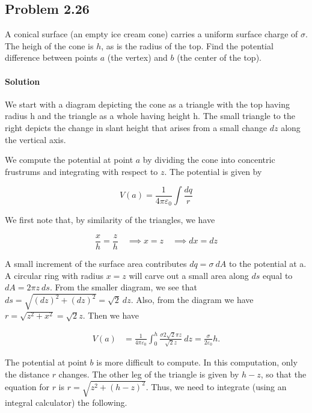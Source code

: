 \documentclass{article}
\begin{document}
\newpage

\subsection*{Problem 2.26} 
A conical surface (an empty ice cream cone) carries a uniform surface charge of $\sigma$. The heigh of the cone is $h$, as is the radius of the top. Find the potential difference between points $a$ (the vertex) and $b$ (the center of the top).

\paragraph{Solution}
We start with a diagram depicting the cone as a triangle with the top having radius h and the triangle as a whole having height h. The small triangle to the right depicts the change in slant height that arises from a small change $dz$ along the vertical axis. 



We compute the potential at point $a$ by dividing the cone into concentric frustrums and integrating with respect to $z$.  The potential is given by 

$$
V(a) = \frac{1}{4\pi \varepsilon_0} \int \frac{dq}{r}
$$

We first note that, by similarity of the triangles, we have 

$$
\frac{x}{h} = \frac{z}{h} \quad \implies x = z \quad \implies dx = dz
$$

A small increment of the surface area contributes $dq = \sigma\ dA$ to the potential at a. A circular ring with radius $x = z$ will carve out a small area along $ds$ equal to $dA = 2\pi z \ ds$.  From the smaller diagram, we see that $ds = \sqrt{(dz)^2 + (dz)^2} = \sqrt{2}\ dz$.  Also, from the diagram we have $r = \sqrt{z^2 + x^2} = \sqrt{2} z$. Then we have

\begin{align*}
    V(a) &= \frac{1}{4\pi \varepsilon_0} \int_0^h \frac{\sigma 2\sqrt{2}\pi z }{\sqrt{2}z}\ dz = \frac{\sigma}{2\varepsilon_0}h.
\end{align*}

The potential at point $b$ is more difficult to compute. In this computation, only the distance $r$ changes. The other leg of the triangle is given by $h - z$, so that the equation for $r$ is $r = \sqrt{z^2 + (h - z)^2}$. Thus, we need to integrate (using an integral calculator) the following.
\end{document}

